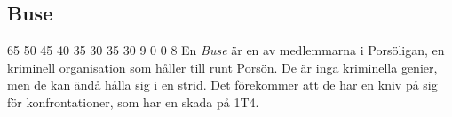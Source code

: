 \subsection{Buse}
\label{var:Buse}
%
\character
{65}	%
{50}	%
{45}	%
{40}	%
{35}	%
{30}	%
{35}	%
{30}	%
{9}		%
{0}		%
{0}		%
{8}		%
%
{
}
%
{
En \textit{Buse} är en av medlemmarna i Porsöligan, en kriminell organisation som håller till runt Porsön. De är inga kriminella genier, men de kan ändå hålla sig i en strid. Det förekommer att de har en kniv på sig för konfrontationer, som har en skada på 1T4.
}
